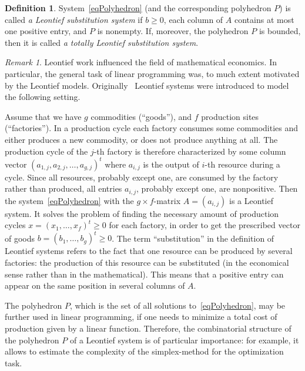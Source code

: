 \documentclass[english,12pt,oneside]{amsproc}
\newcounter{stmcounter}[section]
\numberwithin{equation}{section}
\theoremstyle{plain}
\theoremstyle{definition}
\newtheorem{defin}[stmcounter]{Definition}
\theoremstyle{remark}
\newtheorem{rem}[stmcounter]{Remark}
\begin{document}
\begin{defin}\label{defLeonSys}
System~\eqref{eqPolyhedron} (and the corresponding polyhedron $P$) is called \emph{a Leontief substitution system} if $b\geqslant 0$, each column of $A$ contains at most one positive entry, and $P$ is nonempty. If, moreover, the polyhedron $P$ is bounded, then it is called \emph{a totally Leontief substitution system}.
\end{defin}

\begin{rem}\label{remEconomicsExplained}
Leontief work influenced the field of mathematical economics. In particular, the general task of linear programming was, to much extent motivated by the Leontief models. Originally~\cite{Leon} Leontief systems were introduced to model the following setting.

Assume that we have $g$ commodities (``goods''), and $f$ production sites (``factories''). In a production cycle each factory consumes some commodities and either produces a new commodity, or does not produce anything at all. The production cycle of the $j$-th factory is therefore characterized by some column vector $(a_{1,j},a_{2,j},\ldots,a_{g,j})^t$ where $a_{i,j}$ is the output of $i$-th resource during a cycle. Since all resources, probably except one, are consumed by the factory rather than produced, all entries $a_{i,j}$, probably except one, are nonpositive. Then the system~\eqref{eqPolyhedron} with the $g\times f$-matrix $A=(a_{i,j})$ is a Leontief system. It solves the problem of finding the necessary amount of production cycles $x=(x_1,\ldots,x_f)^t\geqslant0$ for each factory, in order to get the prescribed vector of goods $b=(b_1,\ldots,b_g)^t\geqslant0$. The term ``substitution'' in the definition of Leontief systems refers to the fact that one resource can be produced by several factories: the production of this resource can be substituted (in the economical sense rather than in the mathematical). This means that a positive entry can appear on the same position in several columns of $A$.

The polyhedron $P$, which is the set of all solutions to~\eqref{eqPolyhedron}, may be further used in linear programming, if one needs to minimize a total cost of production given by a linear function. Therefore, the combinatorial structure of the polyhedron $P$ of a Leontief system is of particular importance: for example, it allows to estimate the complexity of the simplex-method for the optimization task.
\end{rem}
\end{document}
